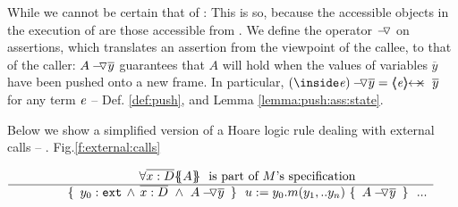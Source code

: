  {While we cannot be certain that   of : 
This is so, because the   accessible objects in the execution of  are those accessible from .
We define the operator $\pushSymbolAA$ on assertions, which   translates an assertion from the viewpoint of the callee, to that of the caller:
 $\PushAS y A$   guarantees that $A$ will hold when the values of variables $\overline y$ have been pushed onto a new frame. In particular,   $\PushAS y {(\inside \re)} =  \protectedFrom \re {\overline {y} }$ for any term  $\re$ -- \cf 
 Def. \ref{def:push},  and Lemma \ref{lemma:push:ass:state}.
}

 {Below we show a simplified version of a Hoare logic rule %
dealing with external calls -- \cf. Fig.\ref{f:external:calls} }
 
 $\inferruleNoName  
 	{ 
   	   {\TwoStatesN {\overline {x:D}} {A}}\ \   \mbox{is part of $M$'s specification}
        }
	{   \triple { \    { \external{y_0}} \,     \wedge \,  \overline{x:D}\  \wedge\  {\PushAS {y}{A}}\ }  
						{ \ u:=y_0.m(y_1,.. y_n)\    }
						{ \    {\PushAS {y}{A}}  \ }
						\  \  ...
         }
$


